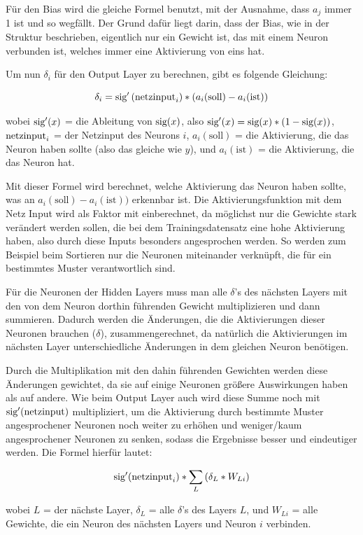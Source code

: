 \documentclass{scrartcl}
\begin{document}
	Für den Bias wird die gleiche Formel benutzt, mit der Ausnahme, dass $a_j$ immer 1 ist und so wegfällt. Der Grund dafür liegt darin, dass der Bias, wie in der Struktur beschrieben, eigentlich nur ein Gewicht ist, das mit einem Neuron verbunden ist, welches immer eine Aktivierung von eins hat.

	Um nun $\delta_i$ für den Output Layer zu berechnen, gibt es folgende Gleichung: 

	{\Large \[
		\delta_i = \textrm{sig} '\left({\textrm{netzinput}}_i\right) * (a_i (\textrm{soll}) - a_i (\textrm{ist})) 
	\]}

	wobei $\textrm{sig} '(x)$ = die Ableitung von $\textrm{sig}(x)$, also $\textrm{sig}'(x) = \textrm{sig}(x) * (1 - \textrm{sig}(x))$, $\textrm{netzinput}_i$ = der Netzinput des Neurons $i$, $a_i(\textrm{soll})$ = die Aktivierung, die das Neuron haben sollte (also das gleiche wie $y$), und $a_i(\textrm{ist})$ = die Aktivierung, die das Neuron hat.

	Mit dieser Formel wird berechnet, welche Aktivierung das Neuron haben sollte, was an $a_i(\textrm{soll}) - a_i(\textrm{ist}))$ erkennbar ist. Die Aktivierungsfunktion mit dem Netz Input wird als Faktor mit einberechnet, da möglichst nur die Gewichte stark verändert werden sollen, die bei dem Trainingsdatensatz eine hohe Aktivierung haben, also durch diese Inputs besonders angesprochen werden. So werden zum Beispiel beim Sortieren nur die Neuronen miteinander verknüpft, die für ein bestimmtes Muster verantwortlich sind.
	
	Für die Neuronen der Hidden Layers muss man alle $\delta$'s des nächsten Layers mit den von dem Neuron dorthin führenden Gewicht multiplizieren und dann summieren. Dadurch werden die Änderungen, die die Aktivierungen dieser Neuronen brauchen ($\delta$), zusammengerechnet, da natürlich die Aktivierungen im nächsten Layer unterschiedliche Änderungen in dem gleichen Neuron benötigen.
	
	Durch die Multiplikation mit den dahin führenden Gewichten werden diese Änderungen gewichtet, da sie auf einige Neuronen größere Auswirkungen haben als auf andere. Wie beim Output Layer auch wird diese Summe noch mit $\textrm{sig}'(\textrm{netzinput})$ multipliziert, um die Aktivierung durch bestimmte Muster angesprochener Neuronen noch weiter zu erhöhen und weniger/kaum angesprochener Neuronen zu senken, sodass die Ergebnisse besser und eindeutiger werden. Die Formel hierfür lautet:

	{\Large \[\textrm{sig}'({\textrm{netzinput}}_i) * \sum_{L}{\left(\delta_L\ast W_{Li}\right)}\]}

	\noindent wobei $L$ = der nächste Layer, $\delta_L$ = alle $\delta$'s des Layers $L$, und $W_{Li}$ = alle Gewichte, die ein Neuron des nächsten Layers und Neuron $i$ verbinden.
\end{document}
